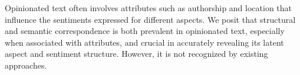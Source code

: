 Opinionated text often involves attributes such as authorship and
location that influence the sentiments expressed for different
aspects. We posit that structural and semantic correspondence is both
prevalent in opinionated text, especially when associated with
attributes, and crucial in accurately revealing its latent aspect and
sentiment structure. However, it is not recognized by existing approaches.